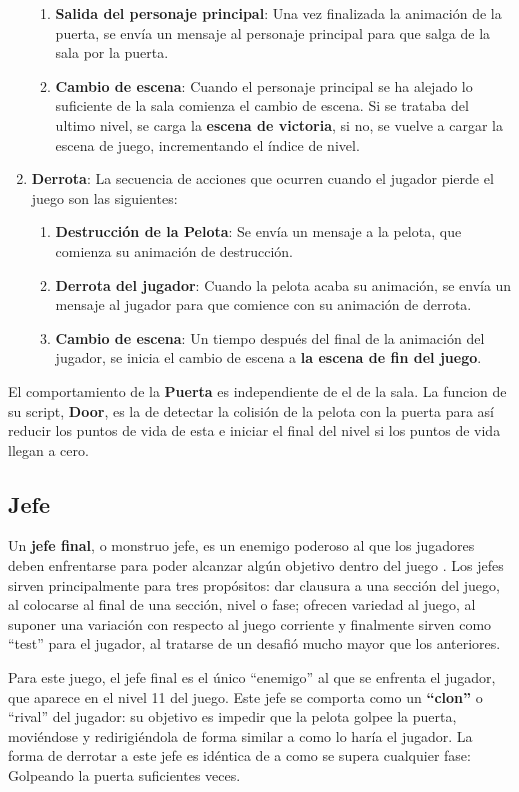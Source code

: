 \begin{enumerate}
\begin{enumerate}
\item \textbf{Salida del personaje principal}: Una vez finalizada la animación de la puerta, se envía un mensaje al personaje principal para que salga de la sala por la puerta.
\item \textbf{Cambio de escena}: Cuando el personaje principal se ha alejado lo suficiente de la sala comienza el cambio de escena. Si se trataba del ultimo nivel, se carga la \textbf{escena de victoria}, si no, se vuelve a cargar la escena de juego, incrementando el índice de nivel.
\end{enumerate}
\item \textbf{Derrota}: La secuencia de acciones que ocurren cuando el jugador pierde el juego son las siguientes:
\begin{enumerate}
\item \textbf{Destrucción de la Pelota}: Se envía un mensaje a la pelota, que comienza su animación de destrucción.
\item \textbf{Derrota del jugador}: Cuando la pelota acaba su animación, se envía un mensaje al jugador para que comience con su animación de derrota.
\item \textbf{Cambio de escena}: Un tiempo después del final de la animación del jugador, se inicia el cambio de escena a \textbf{la escena de fin del juego}.
\end{enumerate}
\end{enumerate}

El comportamiento de la \textbf{Puerta} es independiente de el de la sala. La funcion de su script, \textbf{Door}, es la de detectar la colisión de la pelota con la puerta para así reducir los puntos de vida de esta e iniciar el final del nivel si los puntos de vida llegan a cero.

\subsection{Jefe}
Un \textbf{jefe final}, o monstruo jefe, es un enemigo poderoso al que los jugadores deben enfrentarse para poder alcanzar algún objetivo dentro del juego \cite{game_design_patterns}. Los jefes sirven principalmente para tres propósitos: dar clausura a una sección del juego, al colocarse al final de una sección, nivel o fase; ofrecen variedad al juego, al suponer una variación con respecto al juego corriente y finalmente sirven como ``test'' para el jugador, al tratarse de un desafió mucho mayor que los anteriores. 

Para este juego, el jefe final es el único ``enemigo'' al que se enfrenta el jugador, que aparece en el nivel 11 del juego. Este jefe se comporta como un \textbf{``clon''} o ``rival'' del jugador: su objetivo es impedir que la pelota golpee la puerta, moviéndose y redirigiéndola de forma similar a como lo haría el jugador. La forma de derrotar a este jefe es idéntica de a como se supera cualquier fase: Golpeando la puerta suficientes veces. 

